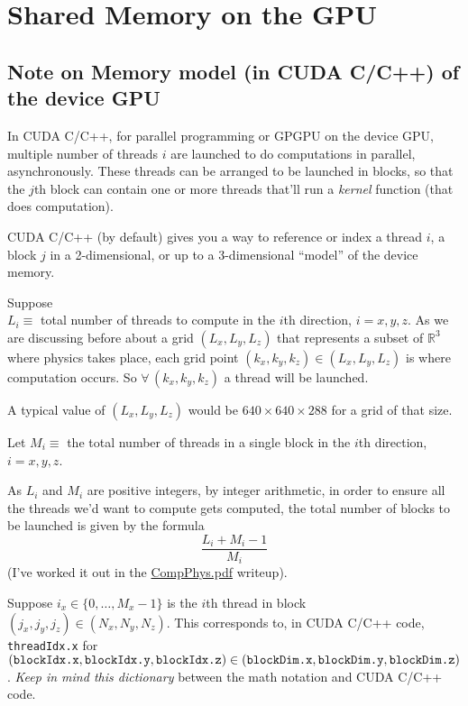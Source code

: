 \documentclass[10pt]{amsart}
\begin{document}
\section{Shared Memory on the GPU}

\subsection{Note on Memory model (in CUDA C/C++) of the device GPU}

In CUDA C/C++, for parallel programming or GPGPU on the device GPU, multiple number of threads $i$ are launched to do computations in parallel, asynchronously.  These threads can be arranged to be launched in blocks, so that the $j$th block can contain one or more threads that'll run a \emph{kernel} function (that does computation).

CUDA C/C++ (by default) gives you a way to reference or index a thread $i$, a block $j$ in a 2-dimensional, or up to a 3-dimensional ``model'' of the device memory.

Suppose \\
$L_i \equiv $ total number of threads to compute in the $i$th direction, $i=x,y,z$.  As we are discussing before about a grid $(L_x,L_y,L_z)$ that represents a subset of $\mathbb{R}^3$ where physics takes place, each grid point $(k_x,k_y,k_z) \in (L_x,L_y,L_z)$ is where computation occurs.  So $\forall \, (k_x,k_y,k_z)$ a thread will be launched.

A typical value of $(L_x,L_y,L_z)$ would be $640\times 640 \times 288$ for a grid of that size.

Let $M_i \equiv $ the total number of threads in a single block in the $i$th direction, $i=x,y,z$.

As $L_i$ and $M_i$ are positive integers, by integer arithmetic, in order to ensure all the threads we'd want to compute gets computed, the total number of blocks to be launched is given by the formula
\[
\frac{ L_i + M_i - 1}{ M_i}
\]
(I've worked it out in the \href{https://github.com/ernestyalumni/CompPhys/blob/master/LaTeXandpdfs/CompPhys.pdf}{CompPhys.pdf} writeup).

Suppose $i_x \in \lbrace 0 , \dots , M_x - 1\rbrace$ is the $i$th thread in block $(j_x,j_y,j_z) \in (N_x,N_y,N_z)$.  This corresponds to, in CUDA C/C++ code, \verb|threadIdx.x| for $(\verb|blockIdx.x|, \verb|blockIdx.y|, \verb|blockIdx.z| ) \in ( \verb|blockDim.x|, \verb|blockDim.y|, \verb|blockDim.z|)$.  \emph{Keep in mind this dictionary} between the math notation and CUDA C/C++ code.
\end{document}
